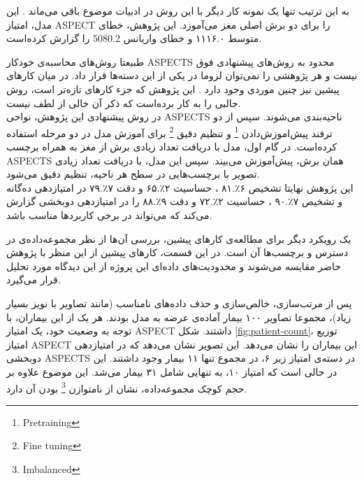 به این ترتیب تنها یک نمونه کار دیگر با این روش در ادبیات موضوع باقی می‌ماند \cite{jung2018evaluating}.
این مدل، امتیاز ASPECT را برای دو برش اصلی مغز می‌آموزد.
این پژوهش، خطای متوسط ۱۱۱۶.۰ و خطای واریانس 5080.2 را گزارش کرده‌است.

طبیعتا روش‌های محاسبه‌ی خودکار ASPECTS محدود به روش‌های پیشنهادی فوق نیست
و هر پژوهشی را نمی‌توان لزوما در یکی از این دسته‌ها قرار داد.
در میان کارهای پیشین نیز چنین موردی وجود دارد \cite{chen2022improving}.
این پژوهش که جزء کار‌های تازه‌تر است، روش جالبی را به کار برده‌است که ذکر آن خالی از لطف نیست.\\

در روش پیشنهادی این پژوهش، نواحی ASPECTS ناحیه‌بندی می‌شوند.
سپس از دو ترفند پیش‌اموزش‌دادن 
\footnote{Pretraining}
و 
تنظیم دقیق 
\footnote{Fine tuning}
برای آموزش مدل در دو مرحله استفاده کرده‌است.
در گام اول، مدل با دریافت تعداد زیادی برش از مغز به همراه برچسب ASPECTS همان برش، پیش‌آموزش می‌بیند.
سپس این مدل، با دریافت تعداد زیادی تصویر با برچسب‌هایی در سطح هر ناحیه، تنظیم دقیق می‌شود.\\

این پژوهش نهایتا تشخیص
۶٪.۸۱
،
حساسیت
۲٪.۶۵
و دقت 
۷٪.۷۹
در امتیازدهی ده‌گانه و 
تشخیص
۷٪.۹۰
،
حساسیت
۲٪.۷۲
و دقت 
۹٪.۸۸
را
در امتیازدهی دوبخشی 
گزارش می‌کند که می‌تواند در برخی کاربرد‌ها مناسب باشد.

یک رویکرد دیگر برای مطالعه‌ی کارهای پیشین، بررسی آن‌ها از نظر مجموعه‌داده‌ی در دسترس و برچسب‌ها آن است.
در این قسمت، کارهای پیشین از این منظر با پژوهش حاضر مقایسه می‌شوند
و
محدودیت‌های داده‌ای این پروژه از این دیدگاه مورد تحلیل قرار می‌گیرد.

پس از مرتب‌سازی، خالص‌سازی و حذف داده‌های نامناسب (مانند تصاویر با نویز بسیار زیاد)، مجموعا تصاویر ۱۰۰ بیمار آماده‌ی عرضه به مدل بودند.
هر یک از این بیماران، با توجه به وضعیت خود، یک امتیاز ASPECT داشتند.
شکل \ref{fig:patient-count}، توزیع امتیاز ASPECT این بیماران را نشان می‌دهد.
این تصویر نشان می‌دهد که در امتیازدهی دوبخشی ASPECTS در دسته‌ی امتیاز زیر ۶، در مجموع تنها ۱۱ بیمار وجود داشتند.
این در حالی است که امتیاز ۱۰، به تنهایی شامل ۳۱ بیمار می‌شد.
این موضوع علاوه بر حجم کوچک مجموعه‌داده، نشان از نامتوازن
\footnote{Imbalanced} 
بودن آن دارد.\\


